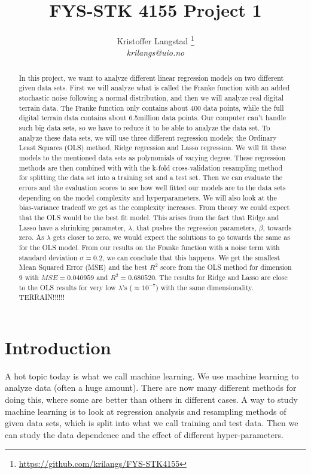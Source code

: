 \documentclass[12pt,a4paper,english]{article}
\title{FYS-STK 4155 Project 1}
\date{}
\author{ Kristoffer Langstad \footnote{\url{https://github.com/krilangs/FYS-STK4155}}\\ \textit{krilangs@uio.no}}
\begin{document}
\maketitle
\begin{abstract}
In this project, we want to analyze different linear regression models on two different given data sets.  First we will analyze what is called the Franke function with an added stochastic noise following a normal distribution, and then we will analyze real digital terrain data. The Franke function only contains about 400 data points, while the full digital terrain data contains about 6.5million data points. Our computer can't handle such big data sets, so we have to reduce it to be able to analyze the data set. To analyze these data sets, we will use three different regression models; the Ordinary Least Squares (OLS) method, Ridge regression and Lasso regression. We will fit these models to the mentioned data sets as polynomials of varying degree. These regression methods are then combined with with the k-fold cross-validation resampling method for splitting the data set into a training set and a test set. Then we can evaluate the errors and the evaluation scores to see how well fitted our models are to the data sets depending on the model complexity and hyperparameters. We will also look at the bias-variance tradeoff we get as the complexity increases. From theory we could expect that the OLS would be the best fit model. This arises from the fact that Ridge and Lasso have a shrinking parameter, $\lambda$, that pushes the regression parameters, $\beta$, towards zero. As $\lambda$ gets closer to zero, we would expect the solutions to go towards the same as for the OLS model. From our results on the Franke function with a noise term with standard deviation $\sigma=0.2$, we can conclude that this happens. We get the smallest Mean Squared Error (MSE) and the best $R^2$ score from the OLS method for dimension 9 with $MSE=0.040959$ and $R^2=0.680520$. The results for Ridge and Lasso are close to the OLS results for very low $\lambda$'s ($\approx 10^{-7}$) with the same dimensionality. TERRAIN!!!!!!
\end{abstract}

\section{Introduction}
A hot topic today is what we call machine learning. We use machine learning to analyze data (often a huge amount). There are now many different methods for doing this, where some are better than others in different cases. A way to study machine learning is to look at regression analysis and resampling methods of given data sets, which is split into what we call training and test data. Then we can study the data dependence and the effect of different hyper-parameters.
\end{document}
